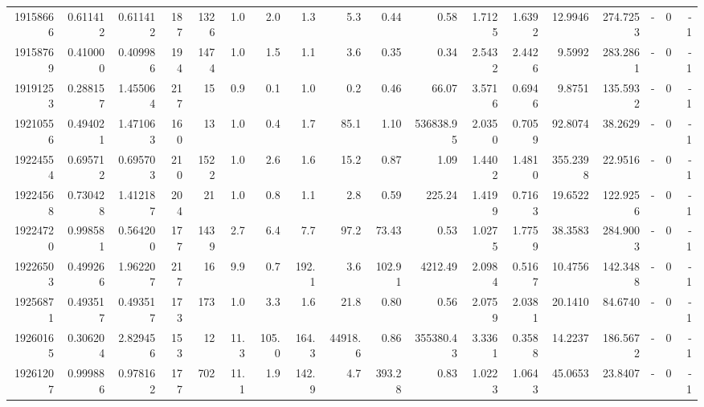 \begin{tabular}{rrrrrrrrrrrrrrrlrr}
  19158666 & 0.611412 &   0.611412 &  187 & 1326 &      1.0 &      2.0 &     1.3 &      5.3 &       0.44 &        0.58 &  1.7125 &  1.6392 &   12.9946 &  274.7253 &             - &        0 &         -1 \\
  19158769 & 0.410000 &   0.409986 &  194 & 1474 &      1.0 &      1.5 &     1.1 &      3.6 &       0.35 &        0.34 &  2.5432 &  2.4426 &    9.5992 &  283.2861 &             - &        0 &         -1 \\
  19191253 & 0.288157 &   1.455064 &  217 &   15 &      0.9 &      0.1 &     1.0 &      0.2 &       0.46 &       66.07 &  3.5716 &  0.6946 &    9.8751 &  135.5932 &             - &        0 &         -1 \\
  19210556 & 0.494021 &   1.471063 &  160 &   13 &      1.0 &      0.4 &     1.7 &     85.1 &       1.10 &   536838.95 &  2.0350 &  0.7059 &   92.8074 &   38.2629 &             - &        0 &         -1 \\
  19224554 & 0.695712 &   0.695703 &  210 & 1522 &      1.0 &      2.6 &     1.6 &     15.2 &       0.87 &        1.09 &  1.4402 &  1.4810 &  355.2398 &   22.9516 &             - &        0 &         -1 \\
  19224568 & 0.730428 &   1.412187 &  204 &   21 &      1.0 &      0.8 &     1.1 &      2.8 &       0.59 &      225.24 &  1.4199 &  0.7163 &   19.6522 &  122.9256 &             - &        0 &         -1 \\
  19224720 & 0.998581 &   0.564200 &  177 & 1439 &      2.7 &      6.4 &     7.7 &     97.2 &      73.43 &        0.53 &  1.0275 &  1.7759 &   38.3583 &  284.9003 &             - &        0 &         -1 \\
  19226503 & 0.499266 &   1.962207 &  217 &   16 &      9.9 &      0.7 &   192.1 &      3.6 &     102.91 &     4212.49 &  2.0984 &  0.5167 &   10.4756 &  142.3488 &             - &        0 &         -1 \\
  19256871 & 0.493517 &   0.493517 &  173 &  173 &      1.0 &      3.3 &     1.6 &     21.8 &       0.80 &        0.56 &  2.0759 &  2.0381 &   20.1410 &   84.6740 &             - &        0 &         -1 \\
  19260165 & 0.306204 &   2.829456 &  153 &   12 &     11.3 &    105.0 &   164.3 &  44918.6 &       0.86 &   355380.43 &  3.3361 &  0.3588 &   14.2237 &  186.5672 &             - &        0 &         -1 \\
  19261207 & 0.999886 &   0.978162 &  177 &  702 &     11.1 &      1.9 &   142.9 &      4.7 &     393.28 &        0.83 &  1.0223 &  1.0643 &   45.0653 &   23.8407 &             - &        0 &         -1 \\

\end{tabular}
